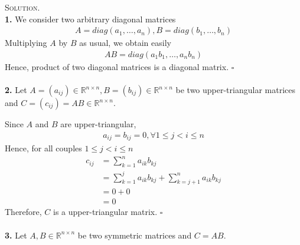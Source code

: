 \documentclass[a4paper,oneside]{book}
\numberwithin{equation}{chapter}
\begin{document}
\textsc{Solution.}\\
\textbf{1.} We consider two arbitrary diagonal matrices
\begin{align}
A = diag\left( {{a_1}, \ldots ,{a_n}} \right),B = diag\left( {{b_1}, \ldots ,{b_n}} \right)
\end{align}
Multiplying $A$ by $B$ as usual, we obtain easily
\begin{align}
AB = diag\left( {{a_1}{b_1}, \ldots ,{a_n}{b_n}} \right)
\end{align}
Hence, product of two diagonal matrices is a diagonal matrix. \hfill $\square$\\
\\
\textbf{2.} Let $A = \left( {{a_{ij}}} \right) \in {\mathbb{R}^{n \times n}},B = \left( {{b_{ij}}} \right) \in {\mathbb{R}^{n \times n}}$ be two upper-triangular matrices and $C=\left( c_{ij}\right) =AB \in \mathbb{R}^{n \times n}$.

Since $A$ and $B$ are upper-triangular, 
\begin{align}
{a_{ij}} = {b_{ij}} = 0,\forall 1 \le j < i \le n
\end{align}
Hence, for all couples $1 \le j < i \le n$
\begin{align}
{c_{ij}} &= \sum\limits_{k = 1}^n {{a_{ik}}{b_{kj}}} \\
& = \sum\limits_{k = 1}^j {{a_{ik}}{b_{kj}}}  + \sum\limits_{k = j + 1}^n {{a_{ik}}{b_{kj}}} \\
 &= 0 + 0\\
& = 0
\end{align}
Therefore, $C$ is a upper-triangular matrix. \hfill $\square$\\
\\
\textbf{3.} Let $A,B \in {\mathbb{R}^{n \times n}}$ be two symmetric matrices and $C=AB$.
\end{document}
